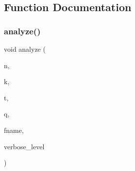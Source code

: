 \subsection{Function Documentation}
\mbox{\label{analyze__q__designs_8_c_a2bb7c896fafb33cfc91cf64d543e5606}} 
\subsubsection{\texorpdfstring{analyze()}{analyze()}}
{\footnotesize\ttfamily void analyze (\begin{DoxyParamCaption}\item[{\mbox{\hyperlink{galois_8h_a09fddde158a3a20bd2dcadb609de11dc}{I\+NT}}}]{n,  }\item[{\mbox{\hyperlink{galois_8h_a09fddde158a3a20bd2dcadb609de11dc}{I\+NT}}}]{k,  }\item[{\mbox{\hyperlink{galois_8h_a09fddde158a3a20bd2dcadb609de11dc}{I\+NT}}}]{t,  }\item[{\mbox{\hyperlink{galois_8h_a09fddde158a3a20bd2dcadb609de11dc}{I\+NT}}}]{q,  }\item[{const \mbox{\hyperlink{galois_8h_ab6cc7b4aeb6ea31aba2b3fbfc83ff5e6}{B\+Y\+TE}} $\ast$}]{fname,  }\item[{\mbox{\hyperlink{galois_8h_a09fddde158a3a20bd2dcadb609de11dc}{I\+NT}}}]{verbose\+\_\+level }\end{DoxyParamCaption})}

\mbox{\label{analyze__q__designs_8_c_aeed4daa4f8cfe6d2005bd991432a6305}} 
